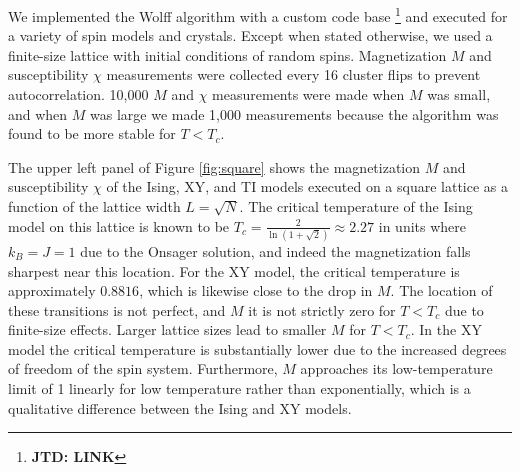\documentclass[amsmath,amssymb,aps,twocolumn,nofootinbib]{revtex4-2}
\newcommand{\jtd}[1]{{\color{red}\textbf{JTD: #1}}}
\begin{document}
We implemented the Wolff algorithm with a custom code base \footnote{\jtd{LINK}} and executed for a variety of spin models and crystals. Except when stated otherwise, we used a finite-size lattice with initial conditions of random spins. Magnetization $M$ and susceptibility $\chi$ measurements were collected every 16 cluster flips to prevent autocorrelation. 10,000 $M$ and $\chi$ measurements were made when $M$ was small, and when $M$ was large we made 1,000 measurements because the algorithm was found to be more stable for $T< T_c$.

The upper left panel of Figure \ref{fig:square} shows the magnetization $M$ and susceptibility $\chi$ of the Ising, XY, and TI models executed on a square lattice as a function of the lattice width $L = \sqrt{N}$. The critical temperature of the Ising model on this lattice is known to be $T_c = \frac{2}{\ln (1 + \sqrt{2})} \approx 2.27$ in units where $k_B = J = 1$ due to the Onsager solution, and indeed the magnetization falls sharpest near this location. For the XY model, the critical temperature is approximately $0.8816$, which is likewise close to the drop in $M$. The location of these transitions is not perfect, and $M$ it is not strictly zero for $T<T_c$ due to finite-size effects. Larger lattice sizes lead to smaller $M$ for $T<T_c$. In the XY model the critical temperature is substantially lower due to the increased degrees of freedom of the spin system. Furthermore, $M$ approaches its low-temperature limit of 1 linearly for low temperature rather than exponentially, which is a qualitative difference between the Ising and XY models.
\end{document}
